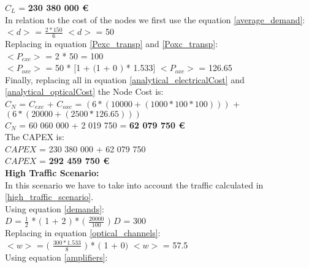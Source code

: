 $C_L$ = \textbf{230 380 000 \euro}\\

In relation to the cost of the nodes we first use the equation \ref{average_demand}:\\

$<d>$ = $\frac{2 * 150}{6}$ \qquad \qquad $<d>$ = 50\\

Replacing in equation \ref{Pexc_transp} and \ref{Poxc_transp}:\\

$<P_{exc}>$ = 2 * 50 = 100\\

$<P_{oxc}>$ = 50 * $[$1 + $($1 + $0$ $)$ * 1.533$]$ \qquad \quad $<P_{oxc}>$ = 126.65 \\

Finally, replacing all in equation \ref{analytical_electricalCost} and \ref{analytical_opticalCost} the Node Cost is:\\

$C_N$ = $C_{exc}$ + $C_{oxc}$ = $\left( 6*(10 000 + (1 000 * 100 * 100 ) ) \right)$ + $\left(6*(20 000 + (2 500 * 126.65 ) ) \right)$\\

$C_N$ = 60 060 000 + 2 019 750 = \textbf{62 079 750 \euro}\\

The CAPEX is:\\
$CAPEX$ = 230 380 000 + 62 079 750\\

$CAPEX$ = \textbf{292 459 750 \euro}\\


\textbf{High Traffic Scenario:}\\
In this scenario we have to take into account the traffic calculated in \ref{high_traffic_scenario}.\\

Using equation \ref{demands}:\\

$D$ = $\frac{1}{2}$ * $($ 1 + 2 $)$ * $($ $\frac{20000}{100}$ $)$ \qquad \qquad $D$ = 300\\

Replacing in equation \ref{optical_channels}:\\

$<w>$ = $($ $\frac{300 * 1.533}{8}$ $)$ * $($ 1 + 0$)$ \qquad \qquad $<w>$ = 57.5\\

Using equation \ref{amplifiers}:\\


